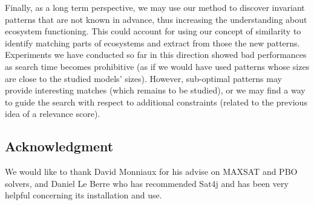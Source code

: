 \documentclass[a4paper,twoside]{article}
\begin{document}
Finally, as a long term perspective, we may use our method to discover invariant patterns that are not known in advance, thus increasing the  understanding about ecosystem functioning. This could account for using our concept of similarity to identify matching parts of ecosystems and extract from those the new patterns. Experiments we have conducted so far in this direction showed bad performances as search time becomes prohibitive (as if we would have used patterns whose sizes are close to the studied models' sizes). %
However, sub-optimal patterns may provide interesting matches (which remains to be studied), or we may find a way to guide the search with respect to additional constraints (related to the previous idea of a relevance score). 




\begin{small}
\subsection*{Acknowledgment}
We would like to thank David Monniaux for his advise on MAXSAT and
PBO solvers, and Daniel Le Berre who has recommended Sat4j and has
been very helpful concerning its installation and use.
\end{small}











%
%
%
%


%
\end{document}
